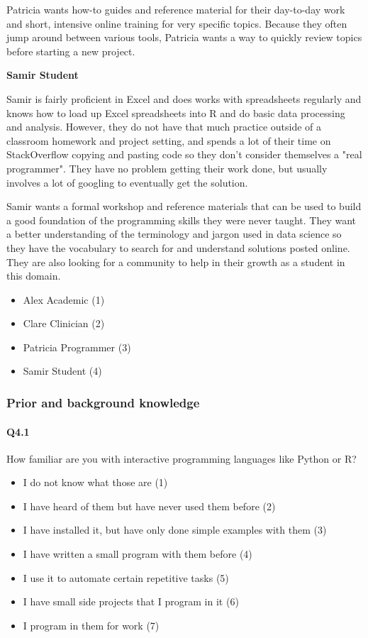 \documentclass[030-workshop.tex]{subfiles}
\begin{document}
 Patricia wants how-to guides and reference material for their day-to-day work
 and short, intensive online training for very specific topics.
 Because they often jump around between various tools, Patricia wants a way to quickly review topics before starting a new project.

\textbf{Samir Student}

 Samir is fairly proficient in Excel and does works with spreadsheets regularly and
 knows how to load up Excel spreadsheets into R and do basic data processing and analysis.
 However, they do not have that much practice outside of a classroom homework and project setting,
 and spends a lot of their time on StackOverflow copying and pasting code so they don't consider themselves a "real programmer".
 They have no problem getting their work done, but usually involves a lot of googling to eventually get the solution.

 Samir wants a formal workshop and reference materials that can be used to build a good foundation of the programming skills they were never taught.
 They want a better understanding of the terminology and jargon used in data science so they have the vocabulary to
 search for and understand solutions posted online. They are also looking for a community to help in their growth as a student in this domain.

\begin{itemize}
    \item Alex Academic  (1)
    \item Clare Clinician  (2)
    \item Patricia Programmer  (3)
    \item Samir Student  (4)
\end{itemize}

\subsubsection{Prior and background knowledge}

    \paragraph{Q4.1}

    How familiar are you with interactive programming languages like Python or R?

    \begin{itemize}
        \item I do not know what those are  (1)
        \item I have heard of them but have never used them before  (2)
        \item I have installed it, but have only done simple examples with them  (3)
        \item I have written a small program with them before  (4)
        \item I use it to automate certain repetitive tasks  (5)
        \item I have small side projects that I program in it  (6)
        \item I program in them for work  (7)
    \end{itemize}
\end{document}
